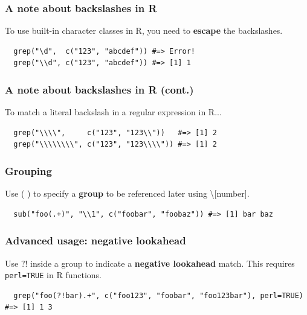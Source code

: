 \documentclass{beamer}
\begin{document}
\begin{frame}[fragile]
  \frametitle{A note about backslashes in R}
  To use built-in character classes in R, you need to \textbf{escape} the
  backslashes.
  \vspace{3mm}

\begin{verbatim}
  grep("\d",  c("123", "abcdef")) #=> Error!
  grep("\\d", c("123", "abcdef")) #=> [1] 1
\end{verbatim}
\end{frame}
\begin{frame}[fragile]
  \frametitle{A note about backslashes in R (cont.)}
  To match a literal backslash in a regular expression in R...
  \vspace{3mm}

\begin{verbatim}
  grep("\\\\",     c("123", "123\\"))   #=> [1] 2
  grep("\\\\\\\\", c("123", "123\\\\")) #=> [1] 2
\end{verbatim}
\end{frame}
\begin{frame}[fragile]
  \frametitle{Grouping}
  Use ( ) to specify a \textbf{group} to be referenced later using \textbackslash [number].
  \vspace{3mm}

\begin{verbatim}
  sub("foo(.+)", "\\1", c("foobar", "foobaz")) #=> [1] bar baz
\end{verbatim}
\end{frame}
\begin{frame}[fragile]
  \frametitle{Advanced usage: negative lookahead}
  Use ?! inside a group to indicate a \textbf{negative lookahead} match. This requires \texttt{perl=TRUE} in R functions.
  \vspace{3mm}

\begin{verbatim}
  grep("foo(?!bar).+", c("foo123", "foobar", "foo123bar"), perl=TRUE) #=> [1] 1 3
\end{verbatim}
\end{frame}
\end{document}
